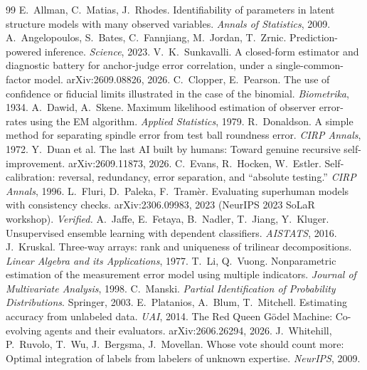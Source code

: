 \documentclass[11pt]{article}
\theoremstyle{definition}
\theoremstyle{remark}
\begin{document}
\begin{thebibliography}{99}\footnotesize\setlength{\itemsep}{0pt}
 E.~Allman, C.~Matias, J.~Rhodes. Identifiability of parameters in latent structure models with many observed variables. \emph{Annals of Statistics}, 2009.
 A.~Angelopoulos, S.~Bates, C.~Fannjiang, M.~Jordan, T.~Zrnic. Prediction-powered inference. \emph{Science}, 2023.
 V.~K.~Sunkavalli. A closed-form estimator and diagnostic battery for anchor-judge error correlation, under a single-common-factor model. arXiv:2609.08826, 2026.
 C.~Clopper, E.~Pearson. The use of confidence or fiducial limits illustrated in the case of the binomial. \emph{Biometrika}, 1934.
 A.~Dawid, A.~Skene. Maximum likelihood estimation of observer error-rates using the EM algorithm. \emph{Applied Statistics}, 1979.
 R.~Donaldson. A simple method for separating spindle error from test ball roundness error. \emph{CIRP Annals}, 1972.
 Y.~Duan et al. The last AI built by humans: Toward genuine recursive self-improvement. arXiv:2609.11873, 2026.
 C.~Evans, R.~Hocken, W.~Estler. Self-calibration: reversal, redundancy, error separation, and ``absolute testing.'' \emph{CIRP Annals}, 1996.
 L.~Fluri, D.~Paleka, F.~Tram\`er. Evaluating superhuman models with consistency checks. arXiv:2306.09983, 2023 (NeurIPS 2023 SoLaR workshop). \emph{Verified.}
 A.~Jaffe, E.~Fetaya, B.~Nadler, T.~Jiang, Y.~Kluger. Unsupervised ensemble learning with dependent classifiers. \emph{AISTATS}, 2016.
 J.~Kruskal. Three-way arrays: rank and uniqueness of trilinear decompositions. \emph{Linear Algebra and its Applications}, 1977.
 T.~Li, Q.~Vuong. Nonparametric estimation of the measurement error model using multiple indicators. \emph{Journal of Multivariate Analysis}, 1998.
 C.~Manski. \emph{Partial Identification of Probability Distributions}. Springer, 2003.
 E.~Platanios, A.~Blum, T.~Mitchell. Estimating accuracy from unlabeled data. \emph{UAI}, 2014.
 The Red Queen G\"odel Machine: Co-evolving agents and their evaluators. arXiv:2606.26294, 2026.
 J.~Whitehill, P.~Ruvolo, T.~Wu, J.~Bergsma, J.~Movellan. Whose vote should count more: Optimal integration of labels from labelers of unknown expertise. \emph{NeurIPS}, 2009.
\end{thebibliography}
\end{document}

